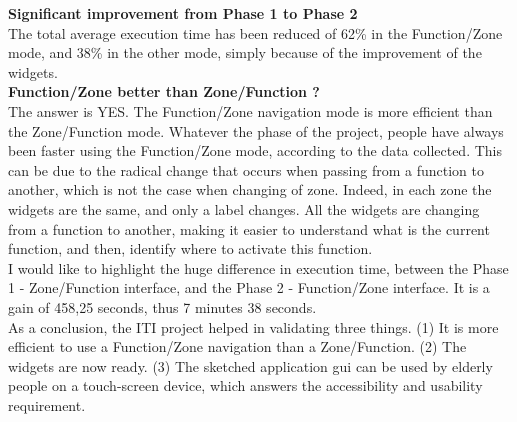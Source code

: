 {\bf Significant improvement from Phase 1 to Phase 2}\\
The total average execution time has been reduced of 62\% in the Function/Zone mode, and 38\% in the other mode, simply because of the improvement of the widgets.\\

{\bf Function/Zone better than Zone/Function ?}\\
The answer is YES. The Function/Zone navigation mode is more efficient than the Zone/Function mode. Whatever the phase of the project, people have always been faster using the Function/Zone mode, according to the data collected. This can be due to the radical change that occurs when passing from a function to another, which is not the case when changing of zone. Indeed, in each zone the widgets are the same, and only a label changes. All the widgets are changing from a function to another, making it easier to understand what is the current function, and then, identify where to activate this function.\\

I would like to highlight the huge difference in execution time, between the Phase 1 - Zone/Function interface, and the Phase 2 - Function/Zone interface. It is a gain of 458,25 seconds, thus 7 minutes 38 seconds.\\
As a conclusion, the ITI project helped in validating three things. (1) It is more efficient to use a Function/Zone navigation than a Zone/Function. (2) The widgets are now ready. (3) The sketched application \gls{gui} can be used by elderly people on a touch-screen device, which answers the accessibility and usability requirement.

